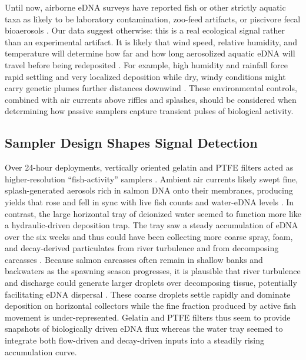 \documentclass{article}
\begin{document}
Until now, airborne eDNA surveys have reported fish or other strictly aquatic taxa as likely to be laboratory contamination, zoo-feed artifacts, or piscivore fecal bioaerosols \cite{klepke2022,lynggaard2023, sullivan2023,lynggaard2022}. Our data suggest otherwise: this is a real ecological signal rather than an experimental artifact. It is likely that wind speed, relative humidity, and temperature will determine how far and how long aerosolized aquatic eDNA will travel before being redeposited \cite{abrego2024,giolai2024}. For example, high humidity and rainfall force rapid settling and very localized deposition while dry, windy conditions might carry genetic plumes further distances downwind \cite{galban2021,maki2023}. These environmental controls, combined with air currents above riffles and splashes, should be considered when determining how passive samplers capture transient pulses of biological activity.

\subsection{Sampler Design Shapes Signal Detection}
Over 24-hour deployments, vertically oriented gelatin and PTFE filters acted as higher-resolution “fish-activity” samplers \cite{jager2025}. Ambient air currents likely swept fine, splash-generated aerosols rich in salmon DNA onto their membranes, producing yields that rose and fell in sync with live fish counts and water-eDNA levels \cite{blanchard1980}. In contrast, the large horizontal tray of deionized water seemed to function more like a hydraulic-driven deposition trap. The tray saw a steady accumulation of eDNA over the six weeks and thus could have been collecting more coarse spray, foam, and decay-derived particulates from river turbulence and from decomposing carcasses \cite{hinds2022,prather2013}. Because salmon carcasses often remain in shallow banks and backwaters as the spawning season progresses, it is plausible that river turbulence and discharge could generate larger droplets over decomposing tissue, potentially facilitating eDNA dispersal \cite{wood2021,herman2023}. These coarse droplets settle rapidly and dominate deposition on horizontal collectors while the fine fraction produced by active fish movement is under-represented. Gelatin and PTFE filters thus seem to provide snapshots of biologically driven eDNA flux whereas the water tray seemed to integrate both flow-driven and decay-driven inputs into a steadily rising accumulation curve.
\end{document}
